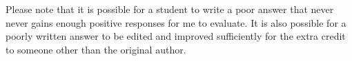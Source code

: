 \documentclass[letterpaper,10pt]{article}
\begin{document}
Please note that it is possible for a student to write a poor answer that never never gains enough positive responses for me to evaluate.  It is also possible for a poorly written answer to be edited and improved sufficiently for the extra credit to someone other than the original author.


\end{document}
